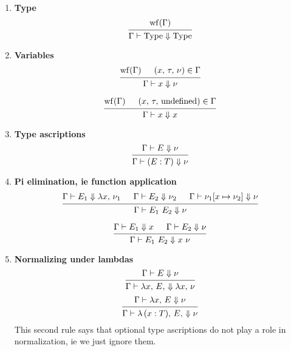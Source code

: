 \documentclass{article}
\begin{document}
\begin{enumerate}
\item \textbf{Type}
  \[
    \begin{prooftree}
      \hypo{\wf(\Gamma)}
      \infer1{\Gamma \vdash \Type \Downarrow \Type} 
    \end{prooftree}
  \]
\item \textbf{Variables} \\
  \[
    \begin{prooftree}
      \hypo{\wf(\Gamma)}
      \hypo{(x, \, \tau, \, \nu) \in \Gamma}
      \infer2{\Gamma \vdash x \Downarrow \nu}
    \end{prooftree} 
  \]

  \[
    \begin{prooftree}
      \hypo{\wf(\Gamma)}
      \hypo{(x, \, \tau, \, \text{undefined}) \in \Gamma}
      \infer2{\Gamma \vdash x \Downarrow x}
    \end{prooftree} 
  \]

\item \textbf{Type ascriptions} \\
  \[
    \begin{prooftree}
      \hypo{\Gamma \vdash E \Downarrow \nu}
      \infer1{\Gamma \vdash (E : T) \Downarrow \nu}
    \end{prooftree}
  \]
  
\item \textbf{Pi elimination, ie function application} \\
  \[
    \begin{prooftree}
      \hypo{\Gamma \vdash E_1 \Downarrow \lambda x, \, \nu_1}
      \hypo{\Gamma \vdash E_2 \Downarrow \nu_2}
      \hypo{\Gamma \vdash \nu_1[x \mapsto \nu_2] \Downarrow \nu}
      \infer3{\Gamma \vdash E_1 \,\, E_2 \Downarrow \nu}
    \end{prooftree}
  \]

  \[
    \begin{prooftree}
      \hypo{\Gamma \vdash E_1 \Downarrow x}
      \hypo{\Gamma \vdash E_2 \Downarrow \nu}
      \infer2{\Gamma \vdash E_1 \,\, E_2 \Downarrow x \,\, \nu}
    \end{prooftree}
  \]

\item \textbf{Normalizing under lambdas} \\
  \[
    \begin{prooftree}
      \hypo{\Gamma \vdash E \Downarrow \nu}
      \infer1{\Gamma \vdash \lambda x, \, E, \, \Downarrow \lambda x, \, \nu}
    \end{prooftree}
  \]
  \[
    \begin{prooftree}
      \hypo{\Gamma \vdash \lambda x, \, E \Downarrow \nu}
      \infer1{\Gamma \vdash \lambda \, (x : T), \, E, \, \Downarrow \nu}
    \end{prooftree}
  \]
  This second rule says that optional type ascriptions do not play a role in
  normalization, ie we just ignore them.


\end{enumerate}
\end{document}

